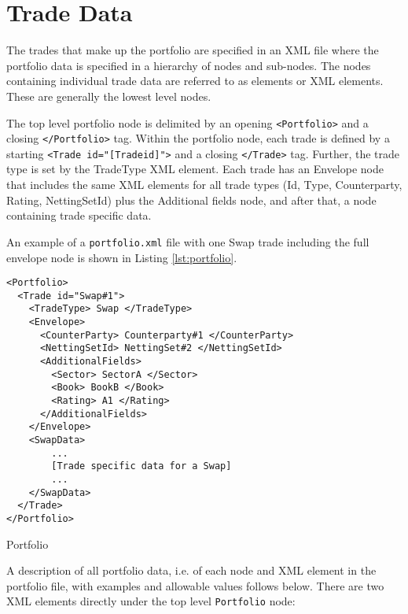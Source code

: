\section{Trade Data}\label{sec:portfolio_data}

The trades that make up the portfolio are specified in an XML file where the portfolio data is specified in a hierarchy
of nodes and sub-nodes.  The nodes containing individual trade data are referred to as elements or XML elements. These
are generally the lowest level nodes.

\vspace{1em}

The top level portfolio node is delimited by an opening {\tt <Portfolio>} and a closing {\tt </Portfolio>} tag. Within
the portfolio node, each trade is defined by a starting {\tt <Trade id="[Tradeid]">} and a closing {\tt </Trade>} tag.
Further, the trade type is set by the TradeType XML element. Each trade has an Envelope node that includes the same XML
elements for all trade types (Id, Type, Counterparty, Rating, NettingSetId) plus the Additional fields node, and after
that, a node containing trade specific data.

\vspace{1em}
An example of a {\tt portfolio.xml} file with one Swap trade including the full envelope node is shown in Listing \ref{lst:portfolio}.

\begin{listing}[H]
\begin{verbatim}
<Portfolio>
  <Trade id="Swap#1">
    <TradeType> Swap </TradeType>
    <Envelope>
      <CounterParty> Counterparty#1 </CounterParty>
      <NettingSetId> NettingSet#2 </NettingSetId>
      <AdditionalFields>
        <Sector> SectorA </Sector>
        <Book> BookB </Book>
        <Rating> A1 </Rating>
      </AdditionalFields>
    </Envelope>
    <SwapData>
        ...
        [Trade specific data for a Swap]
        ...
    </SwapData>
  </Trade>
</Portfolio>
\end{verbatim}
\caption{Portfolio}
\label{lst:portfolio}
\end{listing}

A description of all portfolio data, i.e. of each node and XML element in the portfolio file, with examples and
allowable values follows below. There are two XML elements directly under the top level {\tt Portfolio} node:

